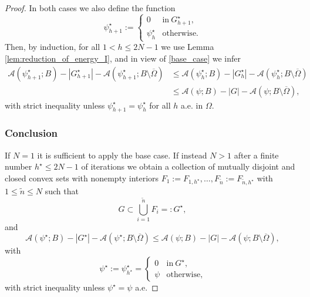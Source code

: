 \documentclass[JEP,XML,SOM,Unicode, NoFloatCountersInSection,published]{cedram}
\let\Om\Omega
\theoremstyle{definition}
\begin{document}
\begin{proof}
In both cases we also define the function
\begin{equation*}
\psi_{h+1}^\star:=\begin{cases}
0&\text{in}\ G_{h+1}^\star,\\
\psi_h^\star&\text{otherwise}.
\end{cases}
\end{equation*}
Then, by induction, for all $1<h\le 2N-1$ we use Lemma \ref{lem:reduction_of_energy_I}, and
in view of \eqref{base_case} we infer
\begin{align*}
\mathcal A(\psi_{h+1}^\star;B)-|G_{h+1}^\star|-\mathcal A(\psi_{h+1}^\star;B\setminus \overline\Omega)&\leq 
\mathcal A(\psi_h^\star;B)-|G_h^\star|-\mathcal A(\psi_h^\star;B\setminus \overline\Omega)\\
&\leq 
\mathcal A(\psi;B)-|G|-\mathcal A(\psi;B\setminus \overline\Omega),
\end{align*}
with strict inequality unless $\psi_{h+1}^\star=\psi_h^\star$ for all $h$ a.e. in $\Om$.

\subsubsection*{Conclusion} If $N=1$ it is sufficient to apply
the base case. If instead $N>1$ after a finite number $h^\star\le 2N-1$ of iterations we obtain a collection of mutually disjoint and closed convex sets with nonempty interiors $F_1:=F_{1,h^\star},\dots,F_{\tilde n}:=F_{\tilde n,h^\star}$ with $1\le \tilde n\le N$ such that
\[
G\subset \bigcup_{i=1}^{\tilde n}F_i=:G^\star,
\]
and
\begin{equation*}\mathcal{A}(\psi^\star;B)-|G^\star|-\mathcal{A}(\psi^\star;B\setminus \overline\Om)\le \mathcal A(\psi; B)-|G|-\mathcal{A}(\psi;B\setminus\overline{\Om}),
\end{equation*}
with
\begin{equation*}
\psi^\star:=\psi_{h^\star}^\star=\begin{cases}
0&\text{in}\ G^\star,\\
\psi&\text{otherwise},
\end{cases}
\end{equation*}
with strict inequality unless $\psi^\star=\psi$ a.e.
\end{proof}
\end{document}
